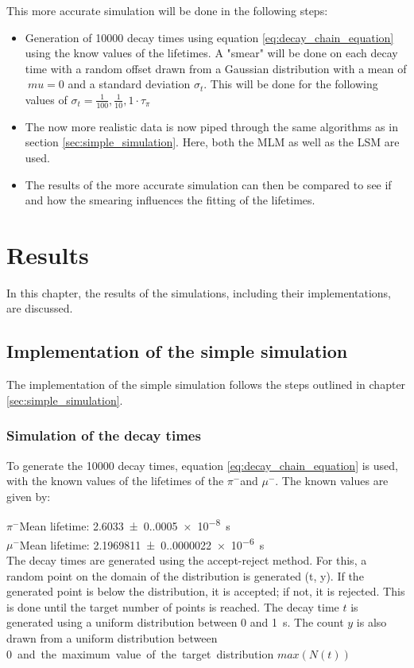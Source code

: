 \documentclass[11pt, a4paper, oneside]{book}
\newcommand{\pion}{$\pi^{-}$}
\newcommand{\muon}{$\mu^{-}$}
\begin{document}
This more accurate simulation will be done in the following steps:
\begin{itemize}
  \item Generation of \num{10000} decay times using equation \ref{eq:decay_chain_equation} using the know values of the lifetimes. A "smear" will be done on each decay time with a random offset drawn from a Gaussian distribution with a mean of $\ mu=0$ and a standard deviation $\sigma_t$. This will be done for the following values of $\sigma_t = \frac{1}{100}, \frac{1}{10}, 1 \cdot \tau_\pi$
  \item The now more realistic data is now piped through the same algorithms as in section \ref{sec:simple_simulation}. Here, both the MLM as well as the LSM are used.
  \item The results of the more accurate simulation can then be compared to see if and how the smearing influences the fitting of the lifetimes.
\end{itemize}


\chapter{Results}

In this chapter, the results of the simulations, including their implementations, are discussed.

\section{Implementation of the simple simulation} \label{sec:simple_simulation_results}
The implementation of the simple simulation follows the steps outlined in chapter \ref{sec:simple_simulation}.
\subsection{Simulation of the decay times}
To generate the \num{10000} decay times, equation \ref{eq:decay_chain_equation} is used, with the known values of the lifetimes of the \pion and \muon. The known values are given by: \cite{ParticleDataGroup:2024cfk}

\pion Mean lifetime: \qty{2.6033(0.0005)e-8}{\s} \\
\muon Mean lifetime: \qty{2.1969811(0.0000022)e-6}{\s} \\

The decay times are generated using the accept-reject method. For this, a random point on the domain of the distribution is generated (t, y). If the generated point is below the distribution, it is accepted; if not, it is rejected. This is done until the target number of points is reached. 
The decay time $t$ is generated using a uniform distribution between 0 and \qty{1}{\s}. The count $y$ is also drawn from a uniform distribution between \qty{0} and the maximum value of the target distribution $max(N(t))$
\end{document}
